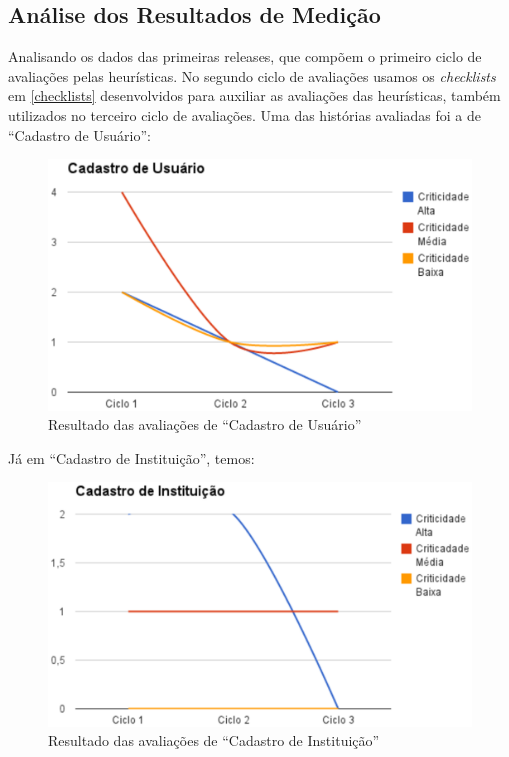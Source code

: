 \subsection{Análise dos Resultados de Medição}
\label{analise}
Analisando os dados das primeiras releases, que compõem o primeiro ciclo de avaliações pelas heurísticas. No segundo ciclo de avaliações usamos os \textit{checklists} em \ref{checklists} desenvolvidos para auxiliar as avaliações das heurísticas, também utilizados no terceiro ciclo de avaliações. Uma das histórias avaliadas foi a de ``Cadastro de Usuário'':

\begin{figure}[h!]
    	\centering
    	\includegraphics[keepaspectratio=true,scale=0.62]
      		{figuras/graf01.eps}
    	\caption{Resultado das avaliações de ``Cadastro de Usuário''}
    	\label{avaliacaouser}
\end{figure}

Já em ``Cadastro de Instituição'', temos:

\begin{figure}[h!]
    	\centering
    	\includegraphics[keepaspectratio=true,scale=0.62]
      		{figuras/graf02.eps}
    	\caption{Resultado das avaliações de ``Cadastro de Instituição''}
    	\label{avaliacaoinstitucion}
\end{figure}

